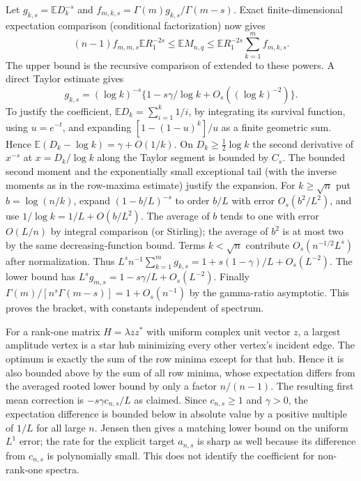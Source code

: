 \documentclass[11pt]{article}
\begin{document}
Let \(g_{k,s}=\mathbb E D_k^{-s}\) and \(f_{m,k,s}=\Gamma(m)g_{k,s}/\Gamma(m-s)\). Exact finite-dimensional expectation comparison (conditional factorization) now gives \[ (n-1)f_{m,m,s}\mathbb E R_1^{-2s}\le\mathbb E M_{n,q}\le \mathbb E R_1^{-2s}\sum_{k=1}^m f_{m,k,s}.\] The upper bound is the recursive comparison of \cite{Vecer} extended to these powers. A direct Taylor estimate gives \[g_{k,s}=(\log k)^{-s}\{1-s\gamma/\log k+O_s((\log k)^{-2})\}.\] To justify the coefficient, \(\mathbb E D_k=\sum_{i=1}^k 1/i\), by integrating its survival function, using \(u=e^{-t}\), and expanding \([1-(1-u)^k]/u\) as a finite geometric sum. Hence \(\mathbb E(D_k-\log k)=\gamma+O(1/k)\). On \(D_k\ge\frac12\log k\) the second derivative of \(x^{-s}\) at \(x=D_k/\log k\) along the Taylor segment is bounded by \(C_s\). The bounded second moment and the exponentially small exceptional tail (with the inverse moments as in the row-maxima estimate) justify the expansion. For \(k\ge\sqrt n\) put \(b=\log(n/k)\), expand \((1-b/L)^{-s}\) to order \(b/L\) with error \(O_s(b^2/L^2)\), and use \(1/\log k=1/L+O(b/L^2)\). The average of \(b\) tends to one with error \(O(L/n)\) by integral comparison (or Stirling); the average of \(b^2\) is at most two by the same decreasing-function bound. Terms \(k<\sqrt n\) contribute \(O_s(n^{-1/2}L^s)\) after normalization. Thus \(L^s n^{-1}\sum_{k=1}^{m}g_{k,s}=1+s(1-\gamma)/L+O_s(L^{-2})\). The lower bound has \(L^s g_{m,s}=1-s\gamma/L+O_s(L^{-2})\). Finally \(\Gamma(m)/[n^s\Gamma(m-s)]=1+O_s(n^{-1})\) by the gamma-ratio asymptotic. This proves the bracket, with constants independent of spectrum.

For a rank-one matrix \(H=\lambda z z^*\) with uniform complex unit vector \(z\), a largest amplitude vertex is a star hub minimizing every other vertex's incident edge. The optimum is exactly the sum of the row minima except for that hub. Hence it is also bounded above by the sum of all row minima, whose expectation differs from the averaged rooted lower bound by only a factor \(n/(n-1)\). The resulting first mean correction is \(-s\gamma c_{n,s}/L\) as claimed. Since \(c_{n,s}\ge1\) and \(\gamma>0\), the expectation difference is bounded below in absolute value by a positive multiple of \(1/L\) for all large \(n\). Jensen then gives a matching lower bound on the uniform \(L^1\) error; the rate for the explicit target \(a_{n,s}\) is sharp as well because its difference from \(c_{n,s}\) is polynomially small. This does not identify the coefficient for non-rank-one spectra.
\end{document}
